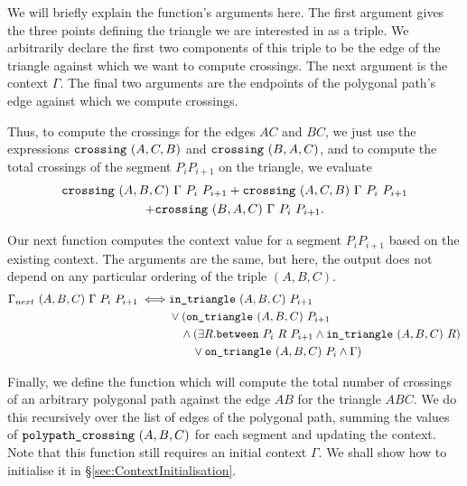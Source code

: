 We will briefly explain the function's arguments here. The first argument gives the three points defining the triangle we are interested in as a triple. We arbitrarily declare the first two components of this triple to be the edge of the triangle against which we want to compute crossings. The next argument is the context $\Gamma$. The final two arguments are the endpoints of the polygonal path's edge against which we compute crossings.

Thus, to compute the crossings for the edges $AC$ and $BC$, we just use the expressions $\texttt{crossing}\ (A,C,B)$ and $\texttt{crossing}\ (B,A,C)$, and to compute the total crossings of the segment $P_iP_{i+1}$ on the triangle, we evaluate
\begin{multline}
\texttt{crossing}\ (A,B,C)\ \Gamma\ P_i\ P_{i+1} + \texttt{crossing}\ (A,C,B)\ \Gamma\ P_i\ P_{i+1}\\ + \texttt{crossing}\ (B,A,C)\ \Gamma\ P_i\ P_{i+1}.
\end{multline}

Our next function computes the context value for a segment $P_iP_{i+1}$ based on the existing context. The arguments are the same, but here, the output does not depend on any particular ordering of the triple $(A,B,C)$.
\begin{equation}
\begin{split}
\Gamma_{next}\ (A,B,C)\ \Gamma\ P_i\ P_{i+1} \iff &\texttt{in\_triangle}\ (A,B,C)\ P_{i+1}\\
& \vee (\texttt{on\_triangle}\ (A,B,C)\ P_{i+1}\\
& \quad \wedge (\exists R. \texttt{between}\ P_i\ R\ P_{i+1} \wedge \texttt{in\_triangle}\ (A,B,C)\ R)\\
& \qquad \vee \texttt{on\_triangle}\ (A,B,C)\ P_i \wedge \Gamma)
\end{split}
\end{equation}

Finally, we define the function which will compute the total number of crossings of an arbitrary polygonal path against the edge $AB$ for the triangle $ABC$. We do this recursively over the list of edges of the polygonal path, summing the values of $\texttt{polypath\_crossing}\ (A,B,C)$ for each segment and updating the context. Note that this function still requires an initial context $\Gamma$. We shall show how to initialise it in \S\ref{sec:ContextInitialisation}.

